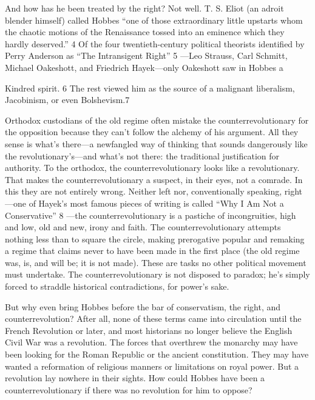  \par 
And how has he been treated by the right? Not well. T. S. Eliot (an adroit blender himself) called Hobbes “one of those extraordinary little upstarts whom the chaotic motions of the Renaissance tossed into an eminence which they hardly deserved.” {\color{blue}4} Of the four twentieth-century political theorists identified by Perry Anderson as “The Intransigent Right” {\color{blue}5} —Leo Strauss, Carl Schmitt, Michael Oakeshott, and Friedrich Hayek—only Oakeshott saw in Hobbes a
 \par 
Kindred spirit. {\color{blue}6} The rest viewed him as the source of a malignant liberalism, Jacobinism, or even Bolshevism.{\color{blue}7}
 \par 
Orthodox custodians of the old regime often mistake the counterrevolutionary for the opposition because they can’t follow the alchemy of his argument. All they sense is what’s there—a newfangled way of thinking that sounds dangerously like the revolutionary’s—and what’s not there: the traditional justification for authority. To the orthodox, the counterrevolutionary looks like a revolutionary. That makes the counterrevolutionary a suspect, in their eyes, not a comrade. In this they are not entirely wrong. Neither left nor, conventionally speaking, right—one of Hayek’s most famous pieces of writing is called “Why I Am Not a Conservative” {\color{blue}8} —the counterrevolutionary is a pastiche of incongruities, high and low, old and new, irony and faith. The counterrevolutionary attempts nothing less than to square the circle, making prerogative popular and remaking a regime that claims never to have been made in the first place (the old regime was, is, and will be; it is not made). These are tasks no other political movement must undertake. The counterrevolutionary is not disposed to paradox; he’s simply forced to straddle historical contradictions, for power’s sake.
 \par 
But why even bring Hobbes before the bar of conservatism, the right, and counterrevolution? After all, none of these terms came into circulation until the French Revolution or later, and most historians no longer believe the English Civil War was a revolution. The forces that overthrew the monarchy may have been looking for the Roman Republic or the ancient constitution. They may have wanted a reformation of religious manners or limitations on royal power. But a revolution lay nowhere in their sights. How could Hobbes have been a counterrevolutionary if there was no revolution for him to oppose?

